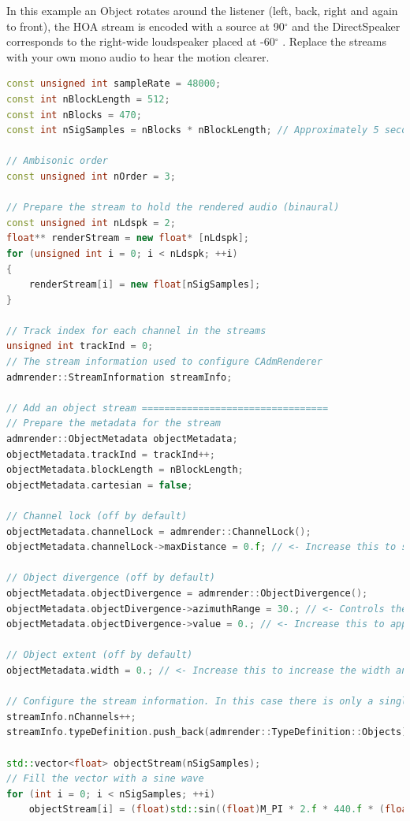 \documentclass[12pt]{report}
\def\deg{$^{\circ}$ }
\begin{document}
In this example an Object rotates around the listener (left, back, right and again to front), the HOA stream is encoded with a source at 90\deg and the DirectSpeaker corresponds to the right-wide loudspeaker placed at -60\deg. Replace the streams with your own mono audio to hear the motion clearer.

\begin{lstlisting}[language=C++]
const unsigned int sampleRate = 48000;
const int nBlockLength = 512;
const int nBlocks = 470;
const int nSigSamples = nBlocks * nBlockLength; // Approximately 5 seconds @ 48 kHz

// Ambisonic order
const unsigned int nOrder = 3;

// Prepare the stream to hold the rendered audio (binaural)
const unsigned int nLdspk = 2;
float** renderStream = new float* [nLdspk];
for (unsigned int i = 0; i < nLdspk; ++i)
{
    renderStream[i] = new float[nSigSamples];
}

// Track index for each channel in the streams
unsigned int trackInd = 0;
// The stream information used to configure CAdmRenderer
admrender::StreamInformation streamInfo;

// Add an object stream =================================
// Prepare the metadata for the stream
admrender::ObjectMetadata objectMetadata;
objectMetadata.trackInd = trackInd++;
objectMetadata.blockLength = nBlockLength;
objectMetadata.cartesian = false;

// Channel lock (off by default)
objectMetadata.channelLock = admrender::ChannelLock();
objectMetadata.channelLock->maxDistance = 0.f; // <- Increase this to see the signal snap to fully in the left loudspeaker

// Object divergence (off by default)
objectMetadata.objectDivergence = admrender::ObjectDivergence();
objectMetadata.objectDivergence->azimuthRange = 30.; // <- Controls the width of the divergence
objectMetadata.objectDivergence->value = 0.; // <- Increase this to apply object divergence

// Object extent (off by default)
objectMetadata.width = 0.; // <- Increase this to increase the width and spread the Object over more adjacent loudspeakers

// Configure the stream information. In this case there is only a single channel stream
streamInfo.nChannels++;
streamInfo.typeDefinition.push_back(admrender::TypeDefinition::Objects);

std::vector<float> objectStream(nSigSamples);
// Fill the vector with a sine wave
for (int i = 0; i < nSigSamples; ++i)
    objectStream[i] = (float)std::sin((float)M_PI * 2.f * 440.f * (float)i / (float)sampleRate);


\end{lstlisting}
\end{document}
